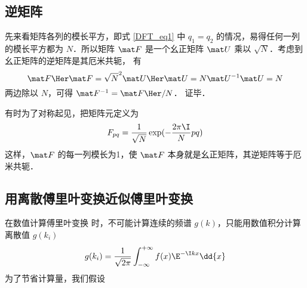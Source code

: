 \subsection{逆矩阵}
先来看矩阵各列的模长平方，即式 \eqref{DFT_eq1} 中 $q_1=q_2$ 的情况，易得任何一列的模长平方都为 $N$．所以矩阵 $\mat F$ 是一个幺正矩阵 $\mat U$ 乘以 $\sqrt{N}$．考虑到幺正矩阵的逆矩阵是其厄米共轭， %
有
\begin{equation}
\mat F\Her \mat F = \sqrt{N}^2 \mat U\Her \mat U = N \mat U^{-1} \mat U = N
\end{equation}
两边除以 $N$，可得 $\mat F^{-1} = \mat F\Her /N$． 证毕．

有时为了对称起见，把矩阵元定义为
\begin{equation}
F_{pq} = \frac{1}{\sqrt{N}}\exp(-\frac{2\pi\I}{N} p q)
\end{equation}
这样，$\mat F$ 的每一列模长为1，使 $\mat F$ 本身就是幺正矩阵，其逆矩阵等于厄米共轭．

\subsection{用离散傅里叶变换近似傅里叶变换}
在数值计算傅里叶变换 %
时，不可能计算连续的频谱 $g(k)$，只能用数值积分计算离散值 $g(k_i)$
\begin{equation}
g(k_i) = \frac{1}{\sqrt{2\pi}} \int_{-\infty}^{+\infty} f(x)\E^{-\I kx} \dd{x}
\end{equation}
为了节省计算量，我们假设

